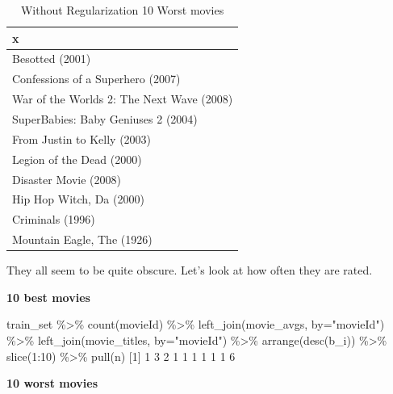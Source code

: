 \documentclass[
]{article}
\newenvironment{Shaded}{}{}
\newcommand{\AttributeTok}[1]{\textcolor[rgb]{0.49,0.56,0.16}{#1}}
\newcommand{\DecValTok}[1]{\textcolor[rgb]{0.25,0.63,0.44}{#1}}
\newcommand{\FunctionTok}[1]{\textcolor[rgb]{0.02,0.16,0.49}{#1}}
\newcommand{\NormalTok}[1]{#1}
\newcommand{\SpecialCharTok}[1]{\textcolor[rgb]{0.25,0.44,0.63}{#1}}
\newcommand{\StringTok}[1]{\textcolor[rgb]{0.25,0.44,0.63}{#1}}
\begin{document}
\begin{table}[H]

\caption{\label{tab:reg_1_m_4}Without Regularization 10 Worst movies\label{tbl:without_regularization_10_worst_movies}}
\centering
\begin{tabular}[t]{l}
\toprule
x\\
\midrule
Besotted (2001)\\
Confessions of a Superhero (2007)\\
War of the Worlds 2: The Next Wave (2008)\\
SuperBabies: Baby Geniuses 2 (2004)\\
From Justin to Kelly (2003)\\
Legion of the Dead (2000)\\
Disaster Movie (2008)\\
Hip Hop Witch, Da (2000)\\
Criminals (1996)\\
Mountain Eagle, The (1926)\\
\bottomrule
\end{tabular}
\end{table}

They all seem to be quite obscure. Let's look at how often they are
rated.

\textbf{10 best movies}

\begin{Shaded}
\begin{Highlighting}[]
\NormalTok{train\_set }\SpecialCharTok{\%\textgreater{}\%} \FunctionTok{count}\NormalTok{(movieId) }\SpecialCharTok{\%\textgreater{}\%} 
  \FunctionTok{left\_join}\NormalTok{(movie\_avgs, }\AttributeTok{by=}\StringTok{"movieId"}\NormalTok{) }\SpecialCharTok{\%\textgreater{}\%}
  \FunctionTok{left\_join}\NormalTok{(movie\_titles, }\AttributeTok{by=}\StringTok{"movieId"}\NormalTok{) }\SpecialCharTok{\%\textgreater{}\%}
  \FunctionTok{arrange}\NormalTok{(}\FunctionTok{desc}\NormalTok{(b\_i)) }\SpecialCharTok{\%\textgreater{}\%} 
  \FunctionTok{slice}\NormalTok{(}\DecValTok{1}\SpecialCharTok{:}\DecValTok{10}\NormalTok{) }\SpecialCharTok{\%\textgreater{}\%} 
  \FunctionTok{pull}\NormalTok{(n)}
\NormalTok{ [}\DecValTok{1}\NormalTok{] }\DecValTok{1} \DecValTok{3} \DecValTok{2} \DecValTok{1} \DecValTok{1} \DecValTok{1} \DecValTok{1} \DecValTok{1} \DecValTok{1} \DecValTok{6}
\end{Highlighting}
\end{Shaded}

\textbf{10 worst movies}
\end{document}
